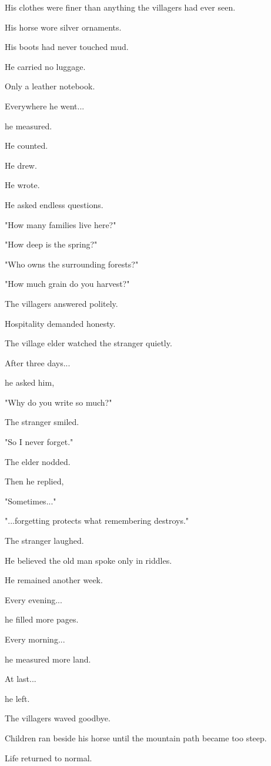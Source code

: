 \documentclass[12pt,openany]{book}
\begin{document}
His clothes were finer than anything the villagers had ever seen.

His horse wore silver ornaments.

His boots had never touched mud.

He carried no luggage.

Only a leather notebook.

Everywhere he went...

he measured.

He counted.

He drew.

He wrote.

He asked endless questions.

"How many families live here?"

"How deep is the spring?"

"Who owns the surrounding forests?"

"How much grain do you harvest?"

The villagers answered politely.

Hospitality demanded honesty.

The village elder watched the stranger quietly.

After three days...

he asked him,

"Why do you write so much?"

The stranger smiled.

"So I never forget."

The elder nodded.

Then he replied,

"Sometimes..."

"...forgetting protects what remembering destroys."

The stranger laughed.

He believed the old man spoke only in riddles.

He remained another week.

Every evening...

he filled more pages.

Every morning...

he measured more land.

At last...

he left.

The villagers waved goodbye.

Children ran beside his horse until the mountain path became too steep.

Life returned to normal.
\end{document}
